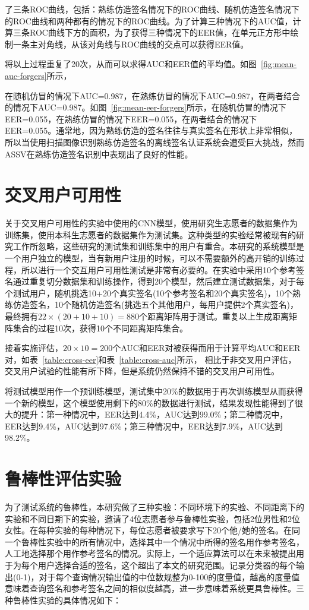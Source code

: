了三条ROC曲线，包括：熟练仿造签名情况下的ROC曲线、随机仿造签名情况下的ROC曲线和两种都有的情况下的ROC曲线。为了计算三种情况下的AUC值，计算三条ROC曲线下方的面积，为了获得三种情况下的EER值，在单元正方形中绘制一条主对角线，从该对角线与ROC曲线的交点可以获得EER值。

将以上过程重复了20次，从而可以求得AUC和EER值的平均值。如图~\ref{fig:mean-auc-forgers}所示，

在随机仿冒的情况下AUC=0.987，在熟练仿冒的情况下AUC=0.987，在两者结合的情况下AUC=0.987。如图~\ref{fig:mean-eer-forgers}所示，在随机仿冒的情况下EER=0.055，在熟练仿冒的情况下EER=0.055，在两者结合的情况下EER=0.055。通常地，因为熟练仿造的签名往往与真实签名在形状上非常相似，所以当使用扫描图像识别熟练仿造签名的离线签名认证系统会遭受巨大挑战，然而ASSV在熟练仿造签名识别中表现出了良好的性能。

\section{交叉用户可用性}

关于交叉用户可用性的实验中使用的CNN模型，使用研究生志愿者的数据集作为训练集，使用本科生志愿者的数据集作为测试集。这种类型的实验经常被现有的研究工作所忽略，这些研究的测试集和训练集中的用户有重合。本研究的系统模型是一个用户独立的模型，当有新用户注册的时候，可以不需要额外的高开销的训练过程，所以进行一个交互用户可用性测试是非常有必要的。在实验中采用10个参考签名通过重复切分数据集和训练操作，得到20个模型，然后建立测试数据集，对于每个测试用户，随机挑选10+20个真实签名(10个参考签名和20个真实签名)，10个熟练仿造签名，10个随机仿造签名(挑选五个其他用户，每用户提供2个真实签名)，最终拥有$22\times (20+10+10)=880$个距离矩阵用于测试。重复以上生成距离矩阵集合的过程10次，获得10个不同距离矩阵集合。

接着实施评估，$20\times 10=200$个AUC和EER对被获得而用于计算平均AUC和EER对，如表~\ref{table:cross-eer}和表~\ref{table:cross-auc}所示，
相比于非交叉用户评估，交叉用户试验的性能有所下降，但是系统仍然保持不错的交叉用户可用性。

将测试模型用作一个预训练模型，测试集中20\%的数据用于再次训练模型从而获得一个新的模型，这个模型使用剩下的80\%的数据进行测试，结果发现性能得到了很大的提升：第一种情况中，EER达到4.4\%，AUC达到99.0\%；第二种情况中，EER达到9.4\%，AUC达到97.6\%；第三种情况中，EER达到7.9\%，AUC达到98.2\%。

\section{鲁棒性评估实验}
\label{sec:robustness-experiment}
为了测试系统的鲁棒性，本研究做了三种实验：不同环境下的实验、不同距离下的实验和不同日期下的实验，邀请了4位志愿者参与鲁棒性实验，包括2位男性和2位女性。在每种实验的每种情况下，每位志愿者被要求写下20个他/她的签名。在同一个鲁棒性实验中的所有情况中，选择其中一个情况中所得的签名用作参考签名，人工地选择那个用作参考签名的情况。实际上，一个适应算法可以在未来被提出用于为每个用户选择合适的签名，这个超出了本文的研究范围。记录分类器的每个输出(0-1)，对于每个查询情况输出值的中位数规整为0-100的度量值，越高的度量值意味着查询签名和参考签名之间的相似度越高，进一步意味着系统更具鲁棒性。三种鲁棒性实验的具体情况如下：

